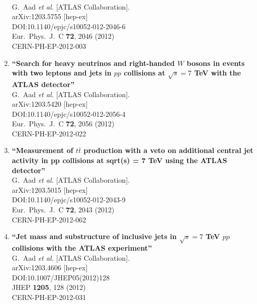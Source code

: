 \documentclass{article}
\begin{document}
\begin{enumerate}
  \\{}G.~Aad {\it et al.} [ATLAS Collaboration].
  \\{}arXiv:1203.5755 [hep-ex]
  \\{}DOI:10.1140/epjc/s10052-012-2046-6
  \\{}Eur.\ Phys.\ J.\ C {\bf 72}, 2046 (2012)
  \\{}CERN-PH-EP-2012-003
\item%
{\bf ``Search for heavy neutrinos and right-handed $W$ bosons in events with two leptons and jets in $pp$ collisions at $\sqrt{s}=7$ TeV with the ATLAS detector''}
  \\{}G.~Aad {\it et al.} [ATLAS Collaboration].
  \\{}arXiv:1203.5420 [hep-ex]
  \\{}DOI:10.1140/epjc/s10052-012-2056-4
  \\{}Eur.\ Phys.\ J.\ C {\bf 72}, 2056 (2012)
  \\{}CERN-PH-EP-2012-022
\item%
{\bf ``Measurement of $t \bar{t}$ production with a veto on additional central jet activity in pp collisions at sqrt(s) = 7 TeV using the ATLAS detector''}
  \\{}G.~Aad {\it et al.} [ATLAS Collaboration].
  \\{}arXiv:1203.5015 [hep-ex]
  \\{}DOI:10.1140/epjc/s10052-012-2043-9
  \\{}Eur.\ Phys.\ J.\ C {\bf 72}, 2043 (2012)
  \\{}CERN-PH-EP-2012-062
\item%
{\bf ``Jet mass and substructure of inclusive jets in $\sqrt{s}=7$ TeV $pp$ collisions with the ATLAS experiment''}
  \\{}G.~Aad {\it et al.} [ATLAS Collaboration].
  \\{}arXiv:1203.4606 [hep-ex]
  \\{}DOI:10.1007/JHEP05(2012)128
  \\{}JHEP {\bf 1205}, 128 (2012)
  \\{}CERN-PH-EP-2012-031

\end{enumerate}
\end{document}
